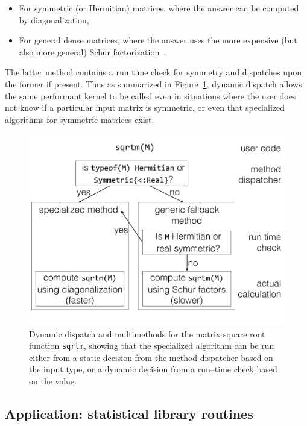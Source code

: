 \documentclass[pldi]{sigplanconf-pldi15}
\begin{document}
\begin{itemize}
	\item For symmetric (or Hermitian) matrices, where the answer can be
		computed by diagonalization,
	\item For general dense matrices, where the answer uses the more
		expensive (but also more general) Schur
		factorization~\cite{Higham2008}.
\end{itemize}
%
The latter method contains a run time check for symmetry and dispatches upon
the former if present. Thus as summarized in Figure~\ref{fig:sqrtm}, dynamic
dispatch allows the same performant kernel to be called even in situations
where the user does not know if a particular input matrix is symmetric, or even
that specialized algorithms for symmetric matrices exist.

\begin{figure}
	\centering
	\includegraphics[width=\columnwidth]{fig-sqrtm}
	\caption{Dynamic dispatch and multimethods for the matrix square root
		function \texttt{sqrtm}, showing that the specialized algorithm
		can be run either from a static decision from the method
		dispatcher based on the input type, or a dynamic decision from
		a run--time check based on the value.}
	\label{fig:sqrtm}
\end{figure}


\subsection{Application: statistical library routines}
\end{document}
